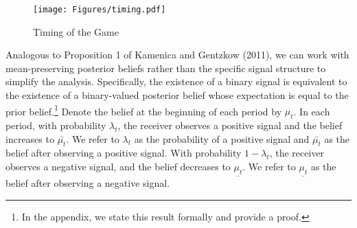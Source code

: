 \documentclass[11pt]{extarticle}
\begin{document}

\begin{figure}[htbp]
	\centering
	\texttt{[image: Figures/timing.pdf]}
	\caption{Timing of the Game}\label{timing}
\end{figure}

Analogous to Proposition 1 of Kamenica and Gentzkow (2011), we can work with mean-preserving posterior beliefs rather than the specific signal structure to simplify the analysis. Specifically, the existence of a binary signal is equivalent to the existence of a binary-valued posterior belief whose expectation is equal to the prior belief.\footnote{In the appendix, we state this result formally and provide a proof.} Denote the belief at the beginning of each period by $\mu_t$. In each period, with probability $\lambda_t$, the receiver observes a positive signal and the belief increases to $\bar{\mu_t}$. We refer to $\lambda_t$ as the probability of a positive signal and $\bar{\mu_t}$ as the belief after observing a positive signal. With probability $1-\lambda_t$, the receiver observes a negative signal, and the belief decreases to $\underline{\mu_t}$. We refer to $\underline{\mu_t}$ as the belief after observing a negative signal.
\end{document}
